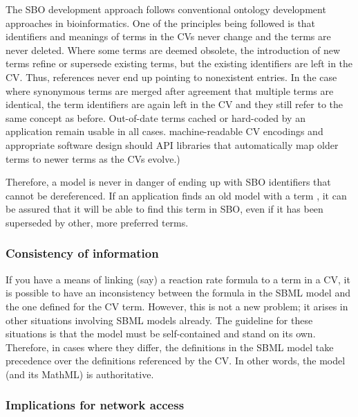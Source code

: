 The SBO development approach follows conventional ontology
development approaches in bioinformatics.  One of the principles
being followed is that identifiers and meanings of terms in the
CVs never change and the terms are never deleted.  Where some
terms are deemed obsolete, the introduction of new terms refine or
supersede existing terms, but the existing identifiers are left in
the CV.  Thus, references never end up pointing to nonexistent
entries.  In the case where synonymous terms are merged after
agreement that multiple terms are identical, the term identifiers
are again left in the CV and they still refer to the same concept
as before.  Out-of-date terms cached or hard-coded by an
application remain usable in all cases.   machine-readable
CV encodings and appropriate software design should   API libraries that automatically map
older terms to newer terms as the CVs evolve.)

Therefore, a model is never in danger of ending up with SBO
identifiers that cannot be dereferenced.  If an application finds
an old model with a term , it can be assured
that it will be able to find this term in SBO, even if it has been
superseded by other, more preferred terms.


\subsubsection{Consistency of information}

If you have a means of linking (say) a reaction rate formula to a
term in a CV, it is possible to have an inconsistency between the
formula in the SBML model and the one defined for the CV term.
However, this is not a new problem; it arises in other situations
involving SBML models already.  The guideline for these situations
is that the model must be self-contained and stand on its own.
Therefore, in cases where they differ, the definitions in the SBML
model take precedence over the definitions referenced by the CV.
In other words, the model (and its MathML) is authoritative.


\subsubsection{Implications for network access}
\label{sec:sbo-implications-for-network-access}

